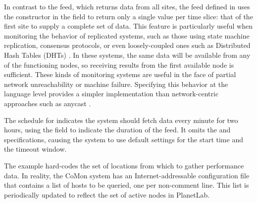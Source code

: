 In contrast to the  feed, which returns data from
all sites, the  feed defined in 
uses the  constructor in the  field to 
return only a single value per time slice: that of the first site to
supply a complete set of data.
%
%
This feature is particularly useful when monitoring the
behavior of replicated systems, such as those using
state machine replication, consensus protocols, or even
loosely-coupled ones such as Distributed Hash Tables (DHTs) 
\cite{Balakrishnan+03:dht}.
In these systems, the same data will be available from any
of the functioning nodes, so receiving results from the first
available node is sufficient. These kinds of monitoring systems
are useful in the face of partial network unreachability or
machine failure. Specifying this behavior at the language level
provides a simpler implementation than network-centric approaches such
as anycast \cite{anycast}. 

The schedule for  indicates the system should fetch data
every minute for two hours, using the  field to indicate
the duration of the feed.  It omits the  and
 specifications, causing the system to use default
settings for the start time and the timeout window.  



The  example hard-codes the set of locations from
which to gather performance data.  In reality, the CoMon system has an
Internet-addressable configuration file that contains a list of hosts
to be queried, one per non-comment line. This list is periodically
updated to reflect the set of active nodes in PlanetLab. 



